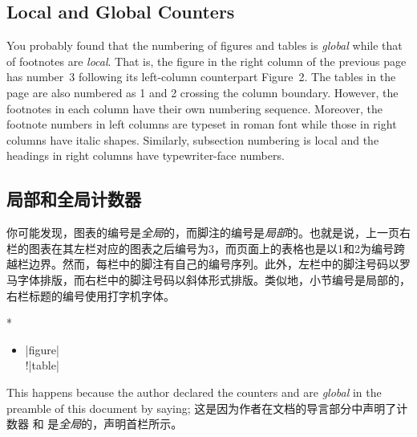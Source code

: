 \begin{paracol}{3}

\begin{VerbatimII}
\end{VerbatimII}

\switchcolumn[1]
\subsection{Local and Global Counters}
You probably found that the numbering of figures and tables is \emph{global}
while that of footnotes are \emph{local}.  That is, the figure in the right
column of the previous page has number~3 following its left-column
counterpart Figure~2.  The tables in the page are also numbered as 1 and 2
crossing the column boundary.  However, the footnotes in each column have
their own numbering sequence.  Moreover, the footnote numbers in left
columns are typeset in roman font while those in right columns have italic
shapes.  Similarly, subsection numbering is local and the headings in right
columns have typewriter-face numbers.
\switchcolumn
\subsection{局部和全局计数器}
你可能发现，图表的编号是\emph{全局}的，而脚注的编号是\emph{局部}的。也就是说，上一页右栏的图表在其左栏对应的图表之后编号为3，而页面上的表格也是以1和2为编号跨越栏边界。然而，每栏中的脚注有自己的编号序列。此外，左栏中的脚注号码以罗马字体排版，而右栏中的脚注号码以斜体形式排版。类似地，小节编号是局部的，右栏标题的编号使用打字机字体。

\switchcolumn[0]*
\begin{itemize}\item[]
\Uidx{\!\globalcounter!}|{figure}|\\
\!\globalcounter!|{table}|
\end{itemize}

\switchcolumn[1]
This happens because the author declared the counters  and
 are \emph{global} in the preamble of this document by
saying;
\switchcolumn
这是因为作者在文档的导言部分中声明了计数器  和  是\emph{全局}的，声明首栏所示。


\end{paracol}
